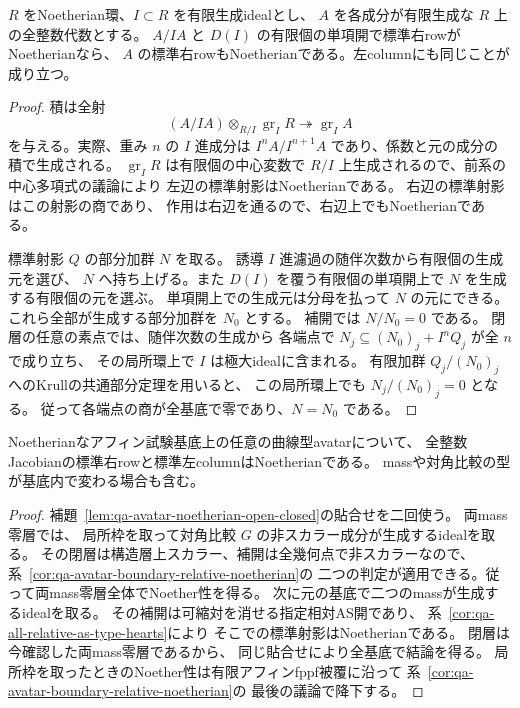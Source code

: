 \begin{lemma}[係数環の閉層と補開におけるNoether性の貼合せ]
\label{lem:qa-avatar-noetherian-open-closed}
$R$ をNoetherian環、$I\subset R$ を有限生成idealとし、
$A$ を各成分が有限生成な $R$ 上の全整数代数とする。
$A/IA$ と $D(I)$ の有限個の単項開で標準右rowがNoetherianなら、
$A$ の標準右rowもNoetherianである。左columnにも同じことが成り立つ。
\end{lemma}
\begin{proof}
積は全射
\[
 (A/IA)\otimes_{R/I}\operatorname{gr}_I R
       \twoheadrightarrow\operatorname{gr}_I A
\]
を与える。実際、重み $n$ の $I$ 進成分は
$I^n A/I^{n+1}A$ であり、係数と元の成分の積で生成される。
$\operatorname{gr}_I R$ は有限個の中心変数で
$R/I$ 上生成されるので、前系の中心多項式の議論により
左辺の標準射影はNoetherianである。
右辺の標準射影はこの射影の商であり、
作用は右辺を通るので、右辺上でもNoetherianである。

標準射影 $Q$ の部分加群 $N$ を取る。
誘導 $I$ 進濾過の随伴次数から有限個の生成元を選び、
$N$ へ持ち上げる。また $D(I)$ を覆う有限個の単項開上で
$N$ を生成する有限個の元を選ぶ。
単項開上での生成元は分母を払って $N$ の元にできる。
これら全部が生成する部分加群を $N_0$ とする。
補開では $N/N_0=0$ である。
閉層の任意の素点では、随伴次数の生成から
各端点で $N_j\subseteq (N_0)_j+I^nQ_j$ が全 $n$ で成り立ち、
その局所環上で $I$ は極大idealに含まれる。
有限加群 $Q_j/(N_0)_j$ へのKrullの共通部分定理を用いると、
この局所環上でも $N_j/(N_0)_j=0$ となる。
従って各端点の商が全基底で零であり、$N=N_0$ である。

\end{proof}

\begin{theorem}[一般のNoetherianアフィン基底上の左右Noether性]
\label{thm:qa-avatar-all-affine-noetherian}
Noetherianなアフィン試験基底上の任意の曲線型avatarについて、
全整数Jacobianの標準右rowと標準左columnはNoetherianである。
massや対角比較の型が基底内で変わる場合も含む。
\end{theorem}
\begin{proof}
補題~\ref{lem:qa-avatar-noetherian-open-closed}の貼合せを二回使う。
両mass零層では、
局所枠を取って対角比較 $G$ の非スカラー成分が生成するidealを取る。
その閉層は構造層上スカラー、補開は全幾何点で非スカラーなので、
系~\ref{cor:qa-avatar-boundary-relative-noetherian}の
二つの判定が適用できる。従って両mass零層全体でNoether性を得る。
次に元の基底で二つのmassが生成するidealを取る。
その補開は可縮対を消せる指定相対AS開であり、
系~\ref{cor:qa-all-relative-as-type-hearts}により
そこでの標準射影はNoetherianである。
閉層は今確認した両mass零層であるから、
同じ貼合せにより全基底で結論を得る。
局所枠を取ったときのNoether性は有限アフィンfppf被覆に沿って
系~\ref{cor:qa-avatar-boundary-relative-noetherian}の
最後の議論で降下する。
\end{proof}

